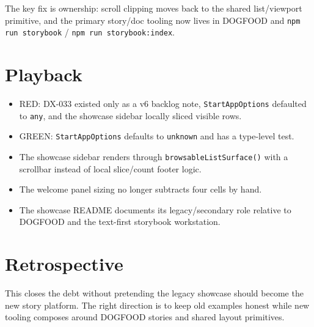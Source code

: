 The key fix is ownership: scroll clipping moves back to the shared list/viewport primitive, and the primary story/doc tooling now lives in DOGFOOD and \texttt{n\allowbreak{}p\allowbreak{}m\allowbreak{} \allowbreak{}r\allowbreak{}u\allowbreak{}n\allowbreak{} \allowbreak{}s\allowbreak{}t\allowbreak{}o\allowbreak{}r\allowbreak{}y\allowbreak{}b\allowbreak{}o\allowbreak{}o\allowbreak{}k} / \texttt{n\allowbreak{}p\allowbreak{}m\allowbreak{} \allowbreak{}r\allowbreak{}u\allowbreak{}n\allowbreak{} \allowbreak{}s\allowbreak{}t\allowbreak{}o\allowbreak{}r\allowbreak{}y\allowbreak{}b\allowbreak{}o\allowbreak{}o\allowbreak{}k\allowbreak{}:\allowbreak{}i\allowbreak{}n\allowbreak{}d\allowbreak{}e\allowbreak{}x}.

\section{Playback}\label{record-131-playback}

\begin{itemize}
\tightlist
\item
  RED: DX-033 existed only as a v6 backlog note, \texttt{S\allowbreak{}t\allowbreak{}a\allowbreak{}r\allowbreak{}t\allowbreak{}A\allowbreak{}p\allowbreak{}p\allowbreak{}O\allowbreak{}p\allowbreak{}t\allowbreak{}i\allowbreak{}o\allowbreak{}n\allowbreak{}s} defaulted to \texttt{a\allowbreak{}n\allowbreak{}y}, and the showcase sidebar locally sliced visible rows.
\item
  GREEN: \texttt{S\allowbreak{}t\allowbreak{}a\allowbreak{}r\allowbreak{}t\allowbreak{}A\allowbreak{}p\allowbreak{}p\allowbreak{}O\allowbreak{}p\allowbreak{}t\allowbreak{}i\allowbreak{}o\allowbreak{}n\allowbreak{}s} defaults to \texttt{u\allowbreak{}n\allowbreak{}k\allowbreak{}n\allowbreak{}o\allowbreak{}w\allowbreak{}n} and has a type-level test.
\item
  The showcase sidebar renders through \texttt{b\allowbreak{}r\allowbreak{}o\allowbreak{}w\allowbreak{}s\allowbreak{}a\allowbreak{}b\allowbreak{}l\allowbreak{}e\allowbreak{}L\allowbreak{}i\allowbreak{}s\allowbreak{}t\allowbreak{}S\allowbreak{}u\allowbreak{}r\allowbreak{}f\allowbreak{}a\allowbreak{}c\allowbreak{}e\allowbreak{}(\allowbreak{})} with a scrollbar instead of local slice/count footer logic.
\item
  The welcome panel sizing no longer subtracts four cells by hand.
\item
  The showcase README documents its legacy/secondary role relative to DOGFOOD and the text-first storybook workstation.
\end{itemize}

\section{Retrospective}\label{record-131-retrospective}

This closes the debt without pretending the legacy showcase should become the new story platform. The right direction is to keep old examples honest while new tooling composes around DOGFOOD stories and shared layout primitives.

